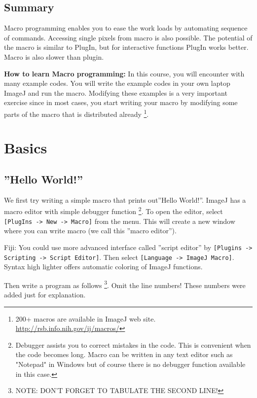 \documentclass[11pt,a4paper,oneside]{report}
\newenvironment{indentFiji}%
{\begin{list}{}%
         {\setlength{\leftmargin}{1em}}%
         \item[]%
}
{\end{list}}
\newcommand{\ijmenu}[1]{\texttt{\small#1}}
\begin{document}
\subsection{Summary}
Macro programming enables you to ease the work loads by automating sequence of commands. 
Accessing single pixels from macro is also possible. 
The potential of the macro is similar to PlugIn, but for interactive functions PlugIn works better. 
Macro is also slower than plugin. 

\textbf{How to learn Macro programming:} 
In this course, you will encounter with many example codes. 
You will write the example codes in your own laptop ImageJ and run the macro. 
Modifying these examples is a very important exercise since in most cases, 
you start writing your macro by modifying some parts of the macro that is distributed already
\footnote{200+ macros are available in ImageJ web site. 
\href{http://rsb.info.nih.gov/ij/macros/}{http://rsb.info.nih.gov/ij/macros/}}. 
\newpage
\section{Basics}

\subsection{''Hello World!''}

We first try writing a simple macro that prints out''Hello World!''. 
ImageJ has a macro editor with simple debugger function
\footnote{Debugger assists you to correct mistakes in the code. 
This is convenient when the code becomes long. 
Macro can be written in any text editor such as "Notepad" in Windows but of course 
there is no debugger function available in this case.}. 
To open the editor, select \ijmenu{[PlugIns -> New -> Macro]} from the menu.  
This will create a new window where you can write macro (we call this ''macro editor''). 
\begin{indentFiji}
Fiji: You could use more advanced interface called ''script editor'' 
by \ijmenu{[Plugins -> Scripting -> Script Editor]}. 
Then select \ijmenu{[Language -> ImageJ Macro]}. 
Syntax high lighter offers automatic coloring of ImageJ functions. 
\end{indentFiji}
Then write a program as follows
\footnote{NOTE: DON'T FORGET TO TABULATE THE SECOND LINE!}. 
Omit the line numbers! These numbers were added just for explanation. 


%
\end{document}
